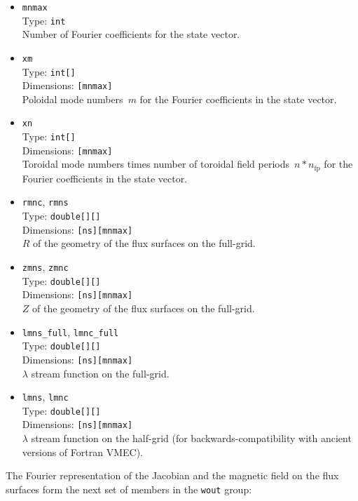 \begin{itemize}
 \item \texttt{mnmax} \\
       Type: \texttt{int} \\
       Number of Fourier coefficients for the state vector.
 \item \texttt{xm} \\
       Type: \texttt{int[]} \\
       Dimensions: \texttt{[mnmax]} \\
       Poloidal mode numbers~$m$ for the Fourier coefficients in the state vector.
 \item \texttt{xn} \\
       Type: \texttt{int[]} \\
       Dimensions: \texttt{[mnmax]} \\
       Toroidal mode numbers times number of toroidal field periods~$n * n_\textrm{fp}$
       for the Fourier coefficients in the state vector.
 \item \texttt{rmnc}, \texttt{rmns} \\
       Type: \texttt{double[][]} \\
       Dimensions: \texttt{[ns][mnmax]} \\
       $R$ of the geometry of the flux surfaces on the full-grid.
 \item \texttt{zmns}, \texttt{zmnc} \\
       Type: \texttt{double[][]} \\
       Dimensions: \texttt{[ns][mnmax]} \\
       $Z$ of the geometry of the flux surfaces on the full-grid.
 \item \texttt{lmns\_full}, \texttt{lmnc\_full} \\
       Type: \texttt{double[][]} \\
       Dimensions: \texttt{[ns][mnmax]} \\
       $\lambda$ stream function on the full-grid.
 \item \texttt{lmns}, \texttt{lmnc} \\
       Type: \texttt{double[][]} \\
       Dimensions: \texttt{[ns][mnmax]} \\
       $\lambda$ stream function on the half-grid (for backwards-compatibility with ancient versions of Fortran VMEC).
\end{itemize}
%
The Fourier representation of
the Jacobian and the magnetic field on the flux surfaces
form the next set of members in the \texttt{wout} group:

